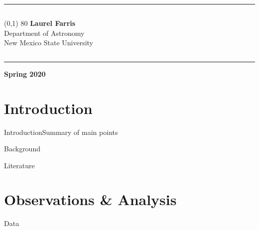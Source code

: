 \documentclass[notes]{beamer}
\newcommand{\myrule}{
    \begin{center}{\color{cadetblue}\rule{\textwidth}{0.3mm}}\end{center}}
\begin{document}

\begin{frame}{}%

    \myrule

    \begin{minipage}{0.65\textwidth}
        \begin{flushleft}
            \fontsize{14}{16}\selectfont\textbf{}
        \end{flushleft}
    \end{minipage}\hfill%
    \begin{minipage}{0.30\textwidth}
        \begin{columns}
            {\color{cadetblue!80!black}\line(0,1) {80}}
            {\large\textbf{Laurel Farris}}\\
            \vspace{0.25cm}
            Department of Astronomy\\
            \vspace{0.25cm}
            New Mexico State University\\
        \end{columns}
    \end{minipage}

    \myrule

    \hfill
    {\large\textbf{Spring 2020}}
\end{frame}

\section{Introduction}
\begin{frame}{Introduction}{Summary of main points}
\end{frame}

\begin{frame}{Background}{}
\end{frame}

\begin{frame}{Literature}{}
\end{frame}

\section{Observations \& Analysis}
\begin{frame}{Data}{}
\end{frame}
\end{document}
